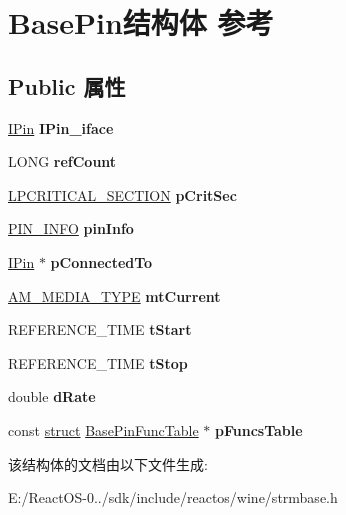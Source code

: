 \hypertarget{struct_base_pin}{}\section{Base\+Pin结构体 参考}
\label{struct_base_pin}
\subsection*{Public 属性}
\begin{DoxyCompactItemize}
\item 
\mbox{\label{struct_base_pin_a19882cf783ea6f2fcf4578bb748cb822}} 
\hyperlink{interface_i_pin}{I\+Pin} {\bfseries I\+Pin\+\_\+iface}
\item 
\mbox{\label{struct_base_pin_ae50086d2266a23171793daf5913b8b62}} 
L\+O\+NG {\bfseries ref\+Count}
\item 
\mbox{\label{struct_base_pin_ab33f883e6c16c05ba4d1162ff747a180}} 
\hyperlink{struct___c_r_i_t_i_c_a_l___s_e_c_t_i_o_n}{L\+P\+C\+R\+I\+T\+I\+C\+A\+L\+\_\+\+S\+E\+C\+T\+I\+ON} {\bfseries p\+Crit\+Sec}
\item 
\mbox{\label{struct_base_pin_a9920bb5069f27af84af78ee445752f8c}} 
\hyperlink{struct_p_i_n___i_n_f_o}{P\+I\+N\+\_\+\+I\+N\+FO} {\bfseries pin\+Info}
\item 
\mbox{\label{struct_base_pin_a4b5798ef9e1c7847a30d880bd439a737}} 
\hyperlink{interface_i_pin}{I\+Pin} $\ast$ {\bfseries p\+Connected\+To}
\item 
\mbox{\label{struct_base_pin_afc2bad47b1b3700f5323d2041f51738f}} 
\hyperlink{struct_a_m___m_e_d_i_a___t_y_p_e}{A\+M\+\_\+\+M\+E\+D\+I\+A\+\_\+\+T\+Y\+PE} {\bfseries mt\+Current}
\item 
\mbox{\label{struct_base_pin_ae3beb5a9b47ffd6778c8cc76193aac96}} 
R\+E\+F\+E\+R\+E\+N\+C\+E\+\_\+\+T\+I\+ME {\bfseries t\+Start}
\item 
\mbox{\label{struct_base_pin_a80a06a7684e76f4873d8a907dedb95b8}} 
R\+E\+F\+E\+R\+E\+N\+C\+E\+\_\+\+T\+I\+ME {\bfseries t\+Stop}
\item 
\mbox{\label{struct_base_pin_a0939c13017174501fab9ccf809a0ff3b}} 
double {\bfseries d\+Rate}
\item 
\mbox{\label{struct_base_pin_a0a158d5840ccdf99181fa27b3c572024}} 
const \hyperlink{interfacestruct}{struct} \hyperlink{struct_base_pin_func_table}{Base\+Pin\+Func\+Table} $\ast$ {\bfseries p\+Funcs\+Table}
\end{DoxyCompactItemize}


该结构体的文档由以下文件生成\+:\begin{DoxyCompactItemize}
\item 
E\+:/\+React\+O\+S-\/0../sdk/include/reactos/wine/strmbase.\+h\end{DoxyCompactItemize}
